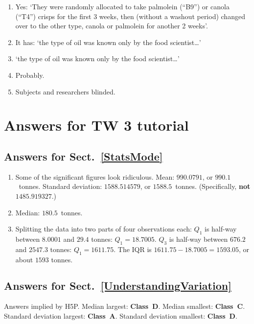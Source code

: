 \documentclass[
  11pt,
  a4paper,
  krantz2]{krantz}
\providecommand{\tightlist}{%
  \setlength{\itemsep}{0pt}\setlength{\parskip}{0pt}}
\begin{document}
\begin{footnotesize}
\begin{enumerate}
\def\labelenumi{\arabic{enumi}.}
\tightlist
\item
  Yes: `They were randomly allocated to take palmolein (``B9'') or canola (``T4'') crisps for the first 3 weeks, then (without a washout period) changed over to the other type, canola or palmolein for another 2 weeks'.
\item
  It has: `the type of oil was known only by the food scientist\ldots{}'
\item
  `the type of oil was known only by the food scientist\ldots{}'
\item
  Probably.
\item
  Subjects and researchers blinded.
\end{enumerate}

\section{Answers for TW 3 tutorial}\label{Lecture3Answers}

\subsection*{Answers for Sect.~\ref{StatsMode}}\label{answers-for-sect.-refstatsmode}

\begin{enumerate}
\def\labelenumi{\arabic{enumi}.}
\tightlist
\item
  Some of the significant figures look ridiculous.
  Mean: \(990.0791\), or \(990.1\)~tonnes.
  Standard deviation: \(1588.514579\), or \(1588.5\)~tonnes.
  (Specifically, \textbf{not} \(1485.919327\).)
\item
  Median: \(180.5\)~tonnes.
\item
  Splitting the data into two parts of four observations each:
  \(Q_1\) is half-way between \(8.0001\) and \(29.4\) tonnes: \(Q_1 = 18.7005\).
  \(Q_3\) is half-way between \(676.2\) and \(2547.3\) tonnes: \(Q_1 = 1611.75\).
  The IQR is \(1611.75 - 18.7005 = 1593.05\), or about \(1593\) tonnes.
\end{enumerate}

\subsection*{Answers for Sect.~\ref{UnderstandingVariation}}\label{answers-for-sect.-refunderstandingvariation}

Answers implied by H5P.
Median largest: \textbf{Class~D}.
Median smallest: \textbf{Class~C}.
Standard deviation largest: \textbf{Class~A}.
Standard deviation smallest: \textbf{Class~D}.


\end{footnotesize}
\end{document}

